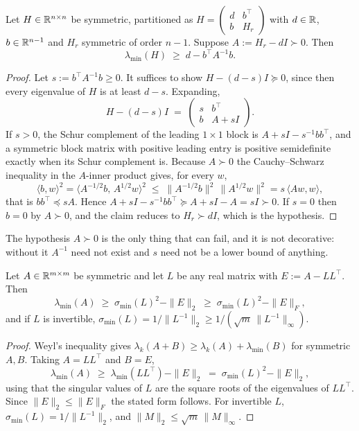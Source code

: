 \begin{proposition}
\label{prop:schur}
Let $H\in\mathbb{R}^{n\times n}$ be symmetric, partitioned as
$H=\begin{pmatrix} d & b^\top\\ b & H_r\end{pmatrix}$ with $d\in\mathbb{R}$,
$b\in\mathbb{R}^{n-1}$ and $H_r$ symmetric of order $n-1$. Suppose
$A := H_r - dI \succ 0$. Then
\[
  \lambda_{\min}(H) \;\ge\; d - b^\top A^{-1} b .
\]
\end{proposition}
\begin{proof}
Let $s := b^\top A^{-1}b \ge 0$. It suffices to show $H-(d-s)I \succeq 0$, since then
every eigenvalue of $H$ is at least $d-s$. Expanding,
\[
  H-(d-s)I \;=\;
  \begin{pmatrix} s & b^\top\\ b & A+sI\end{pmatrix}.
\]
If $s>0$, the Schur complement of the leading $1\times1$ block is
$A+sI - s^{-1}bb^\top$, and a symmetric block matrix with positive leading entry is
positive semidefinite exactly when its Schur complement is. Because $A\succ0$ the
Cauchy--Schwarz inequality in the $A$-inner product gives, for every $w$,
\[
  \langle b,w\rangle^{2}
  = \langle A^{-1/2}b,\,A^{1/2}w\rangle^{2}
  \;\le\; \|A^{-1/2}b\|^{2}\,\|A^{1/2}w\|^{2}
  = s\,\langle Aw,w\rangle,
\]
that is $bb^\top \preceq sA$. Hence
$A+sI-s^{-1}bb^\top \succeq A+sI-A = sI \succ 0$. If $s=0$ then $b=0$ by
$A\succ0$, and the claim reduces to $H_r\succ dI$, which is the hypothesis.
\end{proof}

The hypothesis $A\succ0$ is the only thing that can fail, and it is not decorative:
without it $A^{-1}$ need not exist and $s$ need not be a lower bound of anything.

\begin{lemma}
\label{lem:cholesky}
Let $A\in\mathbb{R}^{m\times m}$ be symmetric and let $L$ be any real matrix with
$E := A-LL^\top$. Then
\[
  \lambda_{\min}(A) \;\ge\; \sigma_{\min}(L)^{2} - \|E\|_2
  \;\ge\; \sigma_{\min}(L)^{2} - \|E\|_F ,
\]
and if $L$ is invertible, $\sigma_{\min}(L)=1/\|L^{-1}\|_2 \ge 1/(\sqrt m\,\|L^{-1}\|_\infty)$.
\end{lemma}
\begin{proof}
Weyl's inequality gives $\lambda_k(A+B)\ge \lambda_k(A)+\lambda_{\min}(B)$ for
symmetric $A,B$. Taking $A=LL^\top$ and $B=E$,
\[
  \lambda_{\min}(A) \;\ge\; \lambda_{\min}(LL^\top) - \|E\|_2
  \;=\; \sigma_{\min}(L)^{2} - \|E\|_2 ,
\]
using that the singular values of $L$ are the square roots of the eigenvalues of
$LL^\top$. Since $\|E\|_2\le\|E\|_F$ the stated form follows. For invertible $L$,
$\sigma_{\min}(L)=1/\|L^{-1}\|_2$, and $\|M\|_2\le\sqrt m\,\|M\|_\infty$.
\end{proof}

